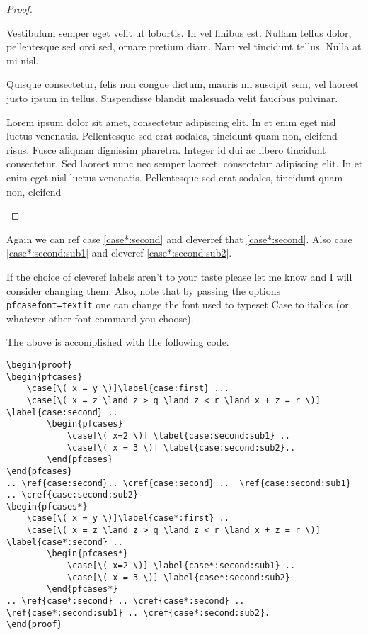 \documentclass[leqno,11pt]{amsart}
\begin{document}
\begin{proof}
\begin{pfcases*}
Vestibulum semper eget velit ut lobortis. In vel finibus est. Nullam tellus dolor, pellentesque sed orci sed, ornare pretium diam. Nam vel tincidunt tellus. Nulla at mi nisl. 

\case[\( x = z \land z > q \land z < r \land x + z = r \)] \label{case*:second} Quisque consectetur, felis non congue dictum, mauris mi suscipit sem, vel laoreet justo ipsum in tellus. Suspendisse blandit malesuada velit faucibus pulvinar. 
\begin{pfcases*}
\case[\( x=2 \)] \label{case*:second:sub1} Lorem ipsum dolor sit amet, consectetur adipiscing elit. In et enim eget nisl luctus venenatis. Pellentesque sed erat sodales, tincidunt quam non, eleifend risus. Fusce aliquam dignissim pharetra. Integer id dui ac libero tincidunt consectetur. Sed laoreet nunc nec semper laoreet. 
\case[\( x = 3 \)] \label{case*:second:sub2}  consectetur adipiscing elit. In et enim eget nisl luctus venenatis. Pellentesque sed erat sodales, tincidunt quam non, eleifend 
\end{pfcases*}
\end{pfcases*}
\end{proof}

Again we can ref case \ref{case*:second} and cleverref that \cref{case*:second}.  Also case \ref{case*:second:sub1} and cleveref \cref{case*:second:sub2}.

If the choice of cleveref labels aren't to your taste please let me know and I will consider changing them.  Also, note that by passing the options \verb!pfcasefont=textit! one can change the font used to typeset Case to italics (or whatever other font command you choose).

\vspace{.5cm}

The above is accomplished with the following code.
\begin{verbatim}
\begin{proof}
\begin{pfcases}
	\case[\( x = y \)]\label{case:first} ...
	\case[\( x = z \land z > q \land z < r \land x + z = r \)] \label{case:second} ..
		\begin{pfcases}
			\case[\( x=2 \)] \label{case:second:sub1} ..
			\case[\( x = 3 \)] \label{case:second:sub2}..
		\end{pfcases}
\end{pfcases}
.. \ref{case:second}.. \cref{case:second} ..  \ref{case:second:sub1} .. \cref{case:second:sub2}
\begin{pfcases*}
	\case[\( x = y \)]\label{case*:first} ..
	\case[\( x = z \land z > q \land z < r \land x + z = r \)] \label{case*:second} ..
		\begin{pfcases*}
			\case[\( x=2 \)] \label{case*:second:sub1} ..
			\case[\( x = 3 \)] \label{case*:second:sub2}
		\end{pfcases*}
.. \ref{case*:second} .. \cref{case*:second} .. \ref{case*:second:sub1} .. \cref{case*:second:sub2}.
\end{proof}
\end{verbatim}
\end{document}
